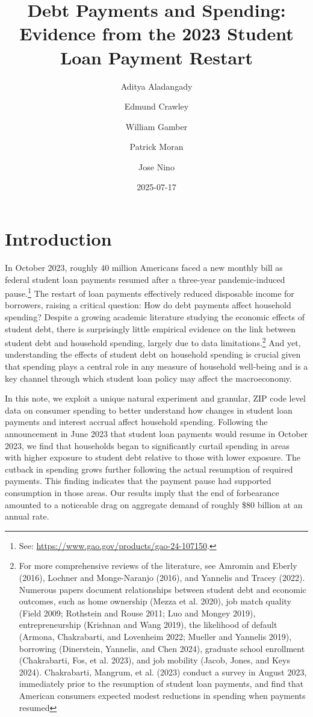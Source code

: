 \documentclass[
  letterpaper,
  DIV=11,
  numbers=noendperiod]{scrartcl}
\title{Debt Payments and Spending: Evidence from the 2023 Student Loan
Payment Restart}
\author{Aditya Aladangady \and Edmund Crawley \and William
Gamber \and Patrick Moran \and Jose Nino}
\date{2025-07-17}
\begin{document}
\maketitle


\section{Introduction}\label{introduction}

In October 2023, roughly 40 million Americans faced a new monthly bill
as federal student loan payments resumed after a three-year
pandemic-induced pause.\footnote{See:
  \url{https://www.gao.gov/products/gao-24-107150}.} The restart of loan
payments effectively reduced disposable income for borrowers, raising a
critical question: How do debt payments affect household spending?
Despite a growing academic literature studying the economic effects of
student debt, there is surprisingly little empirical evidence on the
link between student debt and household spending, largely due to data
limitations.\footnote{For more comprehensive reviews of the literature,
  see Amromin and Eberly (2016), Lochner and Monge-Naranjo (2016), and
  Yannelis and Tracey (2022). Numerous papers document relationships
  between student debt and economic outcomes, such as home ownership
  (Mezza et al. 2020), job match quality (Field 2009; Rothstein and
  Rouse 2011; Luo and Mongey 2019), entrepreneurship (Krishnan and Wang
  2019), the likelihood of default (Armona, Chakrabarti, and Lovenheim
  2022; Mueller and Yannelis 2019), borrowing (Dinerstein, Yannelis, and
  Chen 2024), graduate school enrollment (Chakrabarti, Fos, et al.
  2023), and job mobility (Jacob, Jones, and Keys 2024). Chakrabarti,
  Mangrum, et al. (2023) conduct a survey in August 2023, immediately
  prior to the resumption of student loan payments, and find that
  American consumers expected modest reductions in spending when
  payments resumed} And yet, understanding the effects of student debt
on household spending is crucial given that spending plays a central
role in any measure of household well-being and is a key channel through
which student loan policy may affect the macroeconomy.

In this note, we exploit a unique natural experiment and granular, ZIP
code level data on consumer spending to better understand how changes in
student loan payments and interest accrual affect household spending.
Following the announcement in June 2023 that student loan payments would
resume in October 2023, we find that households began to significantly
curtail spending in areas with higher exposure to student debt relative
to those with lower exposure. The cutback in spending grows further
following the actual resumption of required payments. This finding
indicates that the payment pause had supported consumption in those
areas. Our results imply that the end of forbearance amounted to a
noticeable drag on aggregate demand of roughly \$80 billion at an annual
rate.
\end{document}
